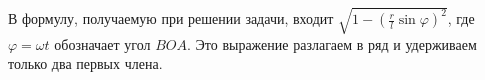 В формулу, получаемую при решении задачи,
входит $\sqrt{1 - (\frac{r}{l}\sin{\varphi})^2}$,
где $\varphi = \omega t$ обозначает угол $BOA$.
Это выражение разлагаем в ряд и удерживаем только два первых члена.
